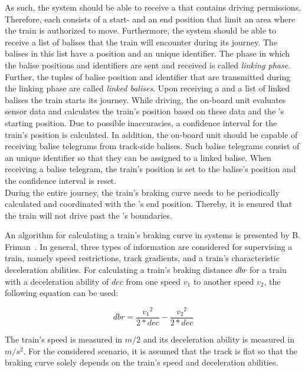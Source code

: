 As such, the system should be able to receive a  that contains driving permissions.
Therefore, each  consists of a start- and an end position that limit an area where the train is authorized to move.
Furthermore, the system should be able to receive a list of balises that the train will encounter during its journey.
The balises in this list have a position and an unique identifier.
The phase in which the balise positions and identifiers are sent and received is called \textit{linking phase}.
Further, the tuples of balise position and identifier that are transmitted during the linking phase are called \textit{linked balises}.
Upon receiving a  and a list of linked balises the train starts its journey.
While driving, the on-board unit evaluates sensor data and calculates the train's position based on these data and the 's starting position.
Due to possible inaccuracies, a confidence interval for the train's position is calculated.
In addition, the on-board unit should be capable of receiving balise telegrams from track-side balises.
Such balise telegrams consist of an unique identifier so that they can be assigned to a linked balise.
When receiving a balise telegram, the train's position is set to the balise's position and the confidence interval is reset.
\\

During the entire journey, the train's braking curve needs to be periodically calculated and coordinated with the 's end position.
Thereby, it is ensured that the train will not drive past the 's boundaries.

An algorithm for calculating a train's braking curve in  systems is presented by B. Friman~\cite{CalculateBrakeCurveFriman}.
In general, three types of information are considered for supervising a train, namely speed restrictions, track gradients, and a train's characteristic deceleration abilities.
For calculating a train's braking distance $dbr$ for a train with a deceleration ability of $dec$ from one speed $v_1$ to another speed $v_2$, the following equation can be used:

\begin{equation}
dbr = \frac{{v_1}^2}{2*dec} - \frac{{v_2}^2}{2*dec}
\end{equation}

The train's speed is measured in $m/2$ and its deceleration ability is measured in $m/s^2$.
For the considered scenario, it is assumed that the track is flat so that the braking curve solely depends on the train's speed and deceleration abilities.

